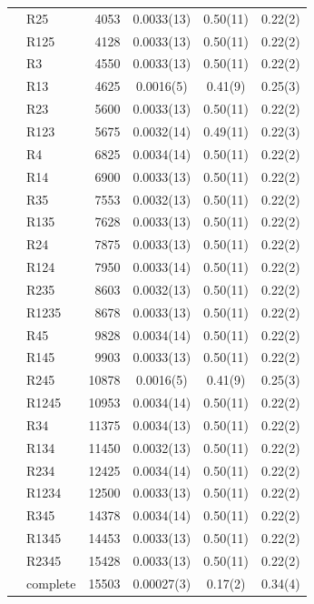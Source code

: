 \begin{tabular}{llrccc}
 & R25 & 4053 & 0.0033(13) & 0.50(11) & 0.22(2) \\
 & R125 & 4128 & 0.0033(13) & 0.50(11) & 0.22(2) \\
 & R3 & 4550 & 0.0033(13) & 0.50(11) & 0.22(2) \\
 & R13 & 4625 & 0.0016(5) & 0.41(9) & 0.25(3) \\
 & R23 & 5600 & 0.0033(13) & 0.50(11) & 0.22(2) \\
 & R123 & 5675 & 0.0032(14) & 0.49(11) & 0.22(3) \\
 & R4 & 6825 & 0.0034(14) & 0.50(11) & 0.22(2) \\
 & R14 & 6900 & 0.0033(13) & 0.50(11) & 0.22(2) \\
 & R35 & 7553 & 0.0032(13) & 0.50(11) & 0.22(2) \\
 & R135 & 7628 & 0.0033(13) & 0.50(11) & 0.22(2) \\
 & R24 & 7875 & 0.0033(13) & 0.50(11) & 0.22(2) \\
 & R124 & 7950 & 0.0033(14) & 0.50(11) & 0.22(2) \\
 & R235 & 8603 & 0.0032(13) & 0.50(11) & 0.22(2) \\
 & R1235 & 8678 & 0.0033(13) & 0.50(11) & 0.22(2) \\
 & R45 & 9828 & 0.0034(14) & 0.50(11) & 0.22(2) \\
 & R145 & 9903 & 0.0033(13) & 0.50(11) & 0.22(2) \\
 & R245 & 10878 & 0.0016(5) & 0.41(9) & 0.25(3) \\
 & R1245 & 10953 & 0.0034(14) & 0.50(11) & 0.22(2) \\
 & R34 & 11375 & 0.0034(13) & 0.50(11) & 0.22(2) \\
 & R134 & 11450 & 0.0032(13) & 0.50(11) & 0.22(2) \\
 & R234 & 12425 & 0.0034(14) & 0.50(11) & 0.22(2) \\
 & R1234 & 12500 & 0.0033(13) & 0.50(11) & 0.22(2) \\
 & R345 & 14378 & 0.0034(14) & 0.50(11) & 0.22(2) \\
 & R1345 & 14453 & 0.0033(13) & 0.50(11) & 0.22(2) \\
 & R2345 & 15428 & 0.0033(13) & 0.50(11) & 0.22(2) \\
 & complete & 15503 & 0.00027(3) & 0.17(2) & 0.34(4) \\
\end{tabular}
